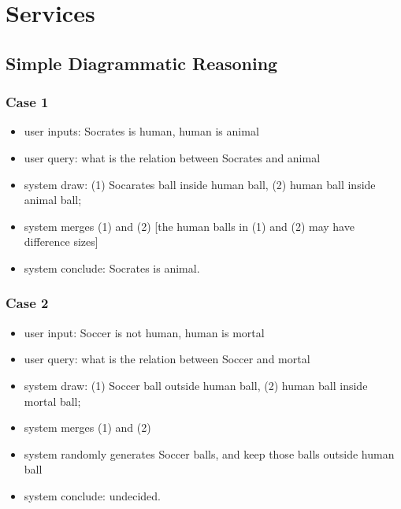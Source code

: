 \documentclass[runningheads]{llncs}
\begin{document}
\section{Services}

\subsection{Simple Diagrammatic Reasoning}
\subsubsection{Case 1}
\begin{itemize}
	\item user inputs: Socrates is human, human is animal
	\item  user query: what is the relation between Socrates and animal
	\item  system draw: (1) Socarates ball inside human ball, (2) human ball inside animal ball; 
	\item system merges (1) and (2) [the human balls in (1) and (2) may have difference sizes]
	\item system conclude: Socrates is animal.
\end{itemize}

\subsubsection{Case 2}
\begin{itemize}
	\item user input: Soccer is not human, human is mortal
	\item  user query: what is the relation between Soccer and mortal
	\item  system draw: (1) Soccer ball outside human ball, (2) human ball inside mortal ball; 
	\item system merges (1) and (2) 
	\item system randomly generates Soccer balls, and keep those balls outside human ball
	\item system conclude: undecided.
\end{itemize}
 
\end{document}
